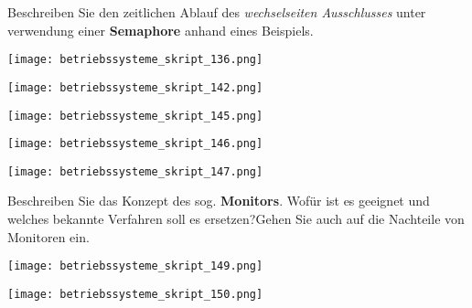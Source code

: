 \documentclass{article}
\begin{document}
\begin{tcolorbox}[colback=white!10!white,colframe=lightgray!75!black,
  savelowerto=\jobname_ex.tex,breakable,enhanced,lines before break=40]

\justifying
Beschreiben Sie den zeitlichen Ablauf des \textit{wechselseiten Ausschlusses} unter verwendung einer \textbf{Semaphore} anhand eines Beispiels.

\tcblower

\justifying
\begin{center}
\texttt{[image: betriebssysteme\_skript\_136.png]}
\end{center}
\begin{center}
\texttt{[image: betriebssysteme\_skript\_142.png]}
\end{center}
\begin{center}
\texttt{[image: betriebssysteme\_skript\_145.png]}
\end{center}
\begin{center}
\texttt{[image: betriebssysteme\_skript\_146.png]}
\end{center}
\begin{center}
\texttt{[image: betriebssysteme\_skript\_147.png]}
\end{center}

\end{tcolorbox}
\begin{tcolorbox}[colback=white!10!white,colframe=lightgray!75!black,
  savelowerto=\jobname_ex.tex,breakable,enhanced,lines before break=40]

\justifying
Beschreiben Sie das Konzept des sog. \textbf{Monitors}. Wofür ist es geeignet und welches bekannte Verfahren soll es ersetzen?Gehen Sie auch auf die Nachteile von Monitoren ein.

\tcblower

\justifying
\begin{center}
\texttt{[image: betriebssysteme\_skript\_149.png]}
\end{center}
\begin{center}
\texttt{[image: betriebssysteme\_skript\_150.png]}
\end{center}

\end{tcolorbox}
\end{document}
